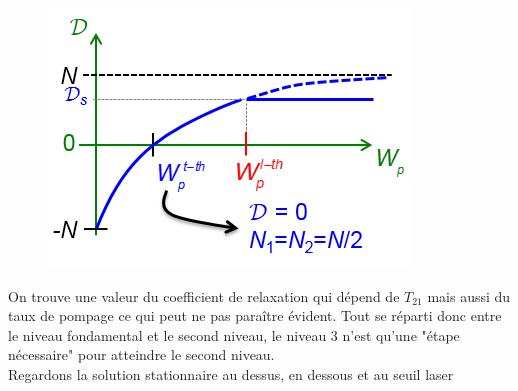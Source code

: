 	\begin{figure}
	\vspace{-12mm}
	\includegraphics[scale=0.6]{ch4/image6.png}
	\end{figure}
On trouve une valeur du coefficient de relaxation qui dépend de $T_{21}$ mais aussi du taux de 
pompage ce qui peut ne pas paraître évident. Tout se réparti donc entre le niveau fondamental et le 
second niveau, le niveau 3 n'est qu'une "étape nécessaire" pour atteindre le second niveau.\\

Regardons la solution stationnaire au dessus, en dessous et au seuil laser\\

